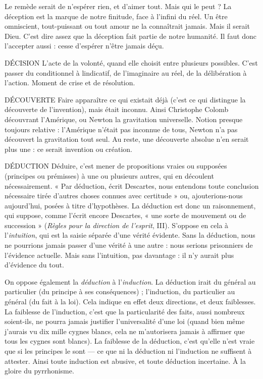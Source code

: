 Le remède serait de n’espérer rien, et d’aimer tout. Mais qui le peut ? La
déception est la marque de notre finitude, face à l'infini du réel. Un être omniscient,
tout-puissant ou tout amour ne la connaîtrait jamais. Mais il serait
Dieu. C’est dire assez que la déception fait partie de notre humanité. Il faut
donc l’accepter aussi : cesse d’espérer n’être jamais déçu.

DÉCISION  L’acte de la volonté, quand elle choisit entre plusieurs possibles.
C’est passer du conditionnel à lindicatif, de l’imaginaire au
réel, de la délibération à l’action. Moment de crise et de résolution.

DÉCOUVERTE Faire apparaître ce qui existait déjà (c’est ce qui distingue
la découverte de l'invention), mais était inconnu. Ainsi
Christophe Colomb découvrant l'Amérique, ou Newton la gravitation universelle.
Notion presque toujours relative : l'Amérique n’était pas inconnue de
tous, Newton n’a pas découvert la gravitation tout seul. Au reste, une découverte
absolue n’en serait plus une : ce serait invention ou création.

DÉDUCTION  Déduire, c’est mener de propositions vraies ou supposées
(principes ou prémisses) à une ou plusieurs autres, qui en
découlent nécessairement. « Par déduction, écrit Descartes, nous entendons
toute conclusion nécessaire tirée d’autres choses connues avec certitude » ou,
ajouterions-nous aujourd’hui, posées à titre d’hypothèses. La déduction est
donc un raisonnement, qui suppose, comme l'écrit encore Descartes, « une
sorte de mouvement ou de succession » ({\it Règles pour la direction de l'esprit}, III).
S’oppose en cela à l’{\it intuition}, qui est la saisie séparée d’une vérité évidente. Sans
la déduction, nous ne pourrions jamais passer d’une vérité à une autre : nous
serions prisonniers de l’évidence actuelle. Mais sans l'intuition, pas davantage :
il n’y aurait plus d’évidence du tout.

On oppose également la {\it déduction} à l'{\it induction}. La déduction irait du
général au particulier (du principe à ses conséquences) ; l'induction, du particulier
au général (du fait à la loi). Cela indique en effet deux directions, et deux
faiblesses. La faiblesse de l’induction, c’est que la particularité des faits, aussi
nombreux soient-ils, ne pourra jamais justifier l’universalité d’une loi (quand
bien même j'aurais vu dix mille cygnes blancs, cela ne m’autorisera jamais à
affirmer que tous les cygnes sont blancs). La faiblesse de la déduction, c’est
qu’elle n’est vraie que si les principes le sont — ce que ni la déduction ni l’induction
ne suffisent à attester. Ainsi toute induction est abusive, et toute déduction
incertaine. À la gloire du pyrrhonisme.


